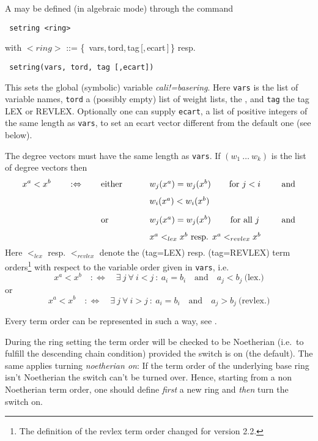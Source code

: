 A  may be defined (in algebraic mode) through the
command 
\begin{verbatim}
 setring <ring>
\end{verbatim}
with $<ring>$ ::= \{\, vars,\,tord,\,tag\,[,\,ecart\,]\,\} resp.
\begin{verbatim}
 setring(vars, tord, tag [,ecart])
\end{verbatim}
\index
This sets the global (symbolic) variable 
\emph{cali!=basering}. Here
\texttt{vars} is the list of variable names, \texttt{tord} a (possibly
empty) list of weight lists, the , and \texttt{tag}
the tag LEX or REVLEX. Optionally one can supply \texttt{ecart}, a list 
of positive integers of the same length as \texttt{vars}, to set an ecart
vector different from the default one (see below).

The degree vectors must have the same length as \texttt{vars}. If $(w_1\
\ldots\ w_k)$ is the list of degree vectors then 
\[x^a<x^b \qquad :\Leftrightarrow \qquad 
\parbox[t]{8cm}{either\hfill 
\parbox[t]{6cm}{$w_j(x^a)=w_j(x^b)$\hfill for $j<i$ \hfill and \\[8pt]
$w_i(x^a)<w_i(x^b)$} \\[10pt] or\hfill 
\parbox[t]{6cm}{$w_j(x^a)=w_j(x^b)$\hfill for all $j$ \hfill and \\[8pt]
$x^a<_{lex}x^b$ resp. $x^a<_{revlex}x^b$}}
\]
Here $<_{lex}$ resp. $<_{revlex}$ denote the
 (tag=LEX) resp. 
(tag=REVLEX) term orders\footnote{The definition of the revlex term
order changed for version 2.2.}
with respect to the variable order given in \texttt{vars}, i.e.\ 
\[x^a<x^b \quad :\Leftrightarrow \quad 
\exists\ j\ \forall\ i<j\ :\ a_i=b_i\quad\mbox{and}\quad a_j<b_j\
\mbox{(lex.)}\]
or 
\[x^a<x^b \quad :\Leftrightarrow \quad 
\exists\ j\ \forall\ i>j\ :\ a_i=b_i\quad\mbox{and}\quad a_j>b_j\
\mbox{(revlex.)}\]

Every term order can be represented in such a way, see \cite{MR88}.

During the ring setting the term order will be checked to be
Noetherian (i.e.\ to fulfill the descending chain condition) provided
the switch \ttindexswitch[CALI]{Noetherian} is on (the default). The same applies
turning \emph{noetherian on}: If the term order of the underlying
base ring isn't Noetherian the switch can't be turned over. Hence,
starting from a non Noetherian term order, one should define {\em
first} a new ring and \emph{then} turn the switch on. 


